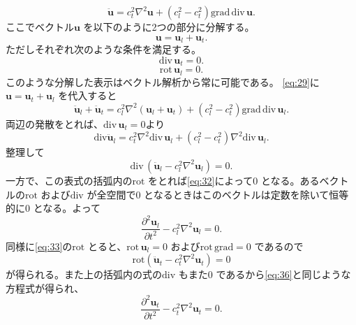 \documentclass[dvipdfmx]{jsreport}
\numberwithin{equation}{chapter}
\numberwithin{table}{chapter}
\begin{document}
\begin{equation}
\label{eq:29}
	\ddot{\bm{u}}=c_t^2 \nabla ^2\bm{u}+(c_l^2-c_t^2)\mathrm{grad}\,\mathrm{div}\,\bm{u}
.\end{equation}
ここでベクトル$\bm{u}$ を以下のように2つの部分に分解する。
\begin{equation}
\label{eq:30}
	\bm{u}=\bm{u}_l+\bm{u}_t
.\end{equation}
ただしそれぞれ次のような条件を満足する。
\begin{equation}
\label{eq:31}
\mathrm{div}\,\bm{u}_t=0
.\end{equation}
\begin{equation}
\label{eq:32}
\mathrm{rot}\,\bm{u}_l=0
.\end{equation}
このような分解した表示はベクトル解析から常に可能である。
\eqref{eq:29}に$\bm{u}=\bm{u}_t+\bm{u}_l$ を代入すると
\begin{equation}
\label{eq:33}
	\ddot{\bm{u}}_l+\ddot{\bm{u}}_t=c_{l}^2 \nabla ^2(\bm{u}_l+\bm{u}_t)+(c_l^2-c_t^2)\mathrm{grad}\,\mathrm{div}\,\bm{u}_l
.\end{equation}
両辺の発散をとれば、$\mathrm{div}\,\bm{u}_t=0$より
\begin{equation}
\label{eq:34}
	\mathrm{div}\ddot{\bm{u}}_l=c_t^2\nabla ^2\mathrm{div}\,\bm{u}_l+(c_l^2-c_t^2)\nabla ^2 \mathrm{div}\,\bm{u}_l
.\end{equation}
整理して
\begin{equation}
\label{eq:35}
	\mathrm{div}\,(\ddot{\bm{u}}_l-c_l^2\nabla ^2\bm{u}_l)=0
.\end{equation}
一方で、この表式の括弧内の$\mathrm{rot}$ をとれば\eqref{eq:32}によって$0$ となる。あるベクトルの$\mathrm{rot}$ および$\mathrm{div}$ が全空間で$0$ となるときはこのベクトルは定数を除いて恒等的に$0$ となる。よって
\begin{equation}
\label{eq:36}
	\frac{\partial ^2\bm{u}_l}{\partial t^2} -c_l^2\nabla ^2\bm{u}_l=0
.\end{equation}
同様に\eqref{eq:33}の$\mathrm{rot}$ とると、$\mathrm{rot}\,\bm{u}_l=0$ および$\mathrm{rot}\,\mathrm{grad}=0$ であるので
\begin{equation}
\label{eq:37}
	\mathrm{rot}(\ddot{\bm{u}}_t-c_t^2\nabla ^2\bm{u}_t)=0
\end{equation}
が得られる。また上の括弧内の式の$\mathrm{div}$ もまた$0$ であるから\eqref{eq:36}と同じような方程式が得られ、
\begin{equation}
\label{eq:38}
	\frac{\partial ^2\bm{u}_t}{\partial t^2} -c_t^2\nabla ^2\bm{u}_t=0
.\end{equation}
\end{document}

